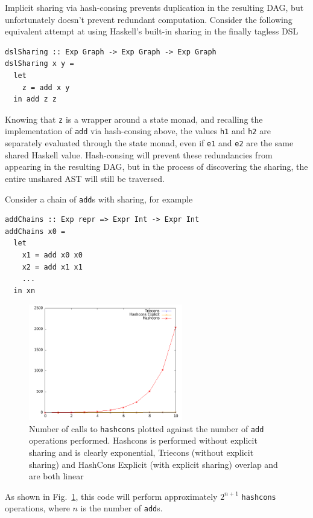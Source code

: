 \documentclass[runningheads]{llncs}
\begin{document}
Implicit sharing via hash-consing prevents duplication in the resulting DAG, but
unfortunately doesn't prevent redundant computation. Consider the following
equivalent attempt at using Haskell's built-in sharing in the finally tagless DSL
\begin{verbatim}
dslSharing :: Exp Graph -> Exp Graph -> Exp Graph
dslSharing x y =
  let
    z = add x y
  in add z z
\end{verbatim}
Knowing that \texttt{z} is a wrapper around a state monad,
and recalling the implementation of
\texttt{add} via hash-consing above, 
the values \texttt{h1} and \texttt{h2} are
separately evaluated through the state monad, even if \texttt{e1} and \texttt{e2} are the same shared Haskell value. 
Hash-consing will prevent these redundancies from appearing in
the resulting DAG, 
but in the process of discovering the sharing, the entire unshared AST will still be traversed.

Consider a chain of \texttt{add}s  with sharing, for example
\begin{verbatim}
addChains :: Exp repr => Expr Int -> Expr Int
addChains x0 = 
  let
    x1 = add x0 x0
    x2 = add x1 x1
    ...
  in xn
\end{verbatim}

\begin{figure}
  \centering
  \includegraphics[width=0.6\textwidth]{figs/hashconscmp.png}
  \caption{Number of calls to \texttt{hashcons} plotted against the
    number of \texttt{add} operations performed.
    Hashcons is performed without explicit sharing and is clearly exponential,
    Triecons (without explicit sharing) and HashCons Explicit (with explicit
    sharing) overlap and are both linear
  } \label{fig:hashcons}
\end{figure}
As shown in Fig.~\ref{fig:hashcons}, this code will perform approximately
$2^{n+1}$ \texttt{hashcons} operations, where $n$ is the number of \texttt{add}s.
\end{document}
